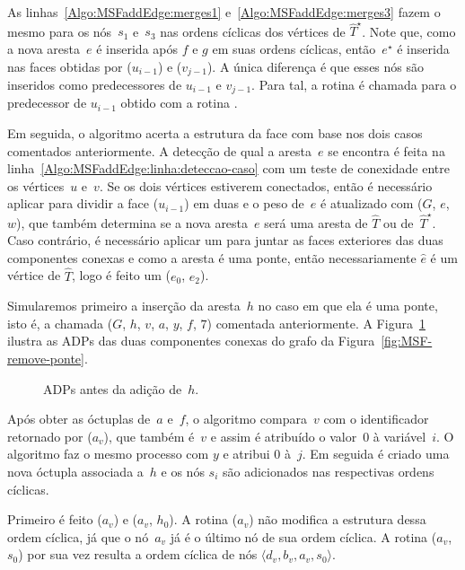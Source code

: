 As linhas~\ref{Algo:MSFaddEdge:merges1} e~\ref{Algo:MSFaddEdge:merges3} fazem o mesmo para os nós~$s_1$ e~$s_3$ nas ordens cíclicas dos vértices de $\hat T^\star$.
Note que, como a nova aresta~$e$ é inserida após $f$ e $g$ em suas ordens cíclicas, então~$e^\star$ é inserida nas faces obtidas por \LCOFindNode($u_{i-1}$) e \LCOFindNode($v_{j-1}$).
A única diferença é que esses nós são inseridos como predecessores de $u_{i-1}$ e $v_{j-1}$.
Para tal, a rotina \LCOCycle{} é chamada para o predecessor de $u_{i-1}$ obtido com a rotina \treapPredecessor.

Em seguida, o algoritmo acerta a estrutura da face com base nos dois casos comentados anteriormente.
A detecção de qual a aresta~$e$ se encontra é feita na linha~\ref{Algo:MSFaddEdge:linha:deteccao-caso} com um teste de conexidade entre os vértices~$u$ e~$v$.
Se os dois vértices estiverem conectados, então é necessário aplicar \LCOSplit{} para dividir a face \LCOFindNode($u_{i-1}$) em duas e o peso de~$e$ é atualizado com \MSFupdate($G$, $e$, $w$), que também determina se a nova aresta~$e$ será uma aresta de $\hat T$ ou de~$\hat T^\star$.
Caso contrário, é necessário aplicar um \LCOMerge{} para juntar as faces exteriores das duas componentes conexas e como a aresta é uma ponte, então necessariamente $\hat e$ é um vértice de $\hat T$, logo é feito um \LCOMerge($e_0$, $e_2$).

Simularemos primeiro a inserção da aresta~$h$ no caso em que ela é uma ponte, isto é, a chamada \MSFaddEdge($G$, $h$, $v$, $a$, $y$, $f$, $7$) comentada anteriormente.
A Figura~\ref{fig:MSF-adiciona-ponte-1} ilustra as ADPs das duas componentes conexas do grafo da Figura~\ref{fig:MSF-remove-ponte}.

\begin{figure}
\scalebox{1}{

}
\caption{ADPs antes da adição de~$h$.}
\label{fig:MSF-adiciona-ponte-1}
\end{figure}

Após obter as óctuplas de~$a$ e~$f$, o algoritmo compara~$v$ com o identificador retornado por \LCOFindNode($a_v$), que também é~$v$ e assim é atribuído o valor~$0$ à variável~$i$.
O algoritmo faz o mesmo processo com $y$ e atribui $0$ à~$j$.
Em seguida é criado uma nova óctupla associada a~$h$ e os nós $s_i$ são adicionados nas respectivas ordens cíclicas.

Primeiro é feito \LCOCycle($a_v$) e \LCOMerge($a_v$, $h_0$).
A rotina \LCOCycle($a_v$) não modifica a estrutura dessa ordem cíclica, já que o nó~$a_v$ já é o último nó de sua ordem cíclica.
A rotina \LCOMerge($a_v$, $s_0$) por sua vez resulta a ordem cíclica de nós $\langle d_v, b_v, a_v, s_0 \rangle$.

